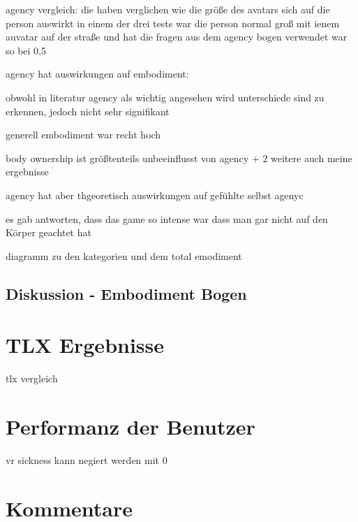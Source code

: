 agency vergleich: \cite{Abtahi2019}
die haben verglichen wie die größe des avatars sich auf die person auswirkt
in einem der drei tests war die person normal groß mit ienem auvatar auf der straße und hat die fragen aus dem agency bogen verwendet
war so bei 0,5


agency hat auswirkungen auf embodiment: \cite{Koilias2019}

obwohl in literatur agency als wichtig angesehen wird
unterschiede sind zu erkennen, jedoch nicht sehr signifikant

generell embodiment war recht hoch




body ownership ist größtenteils unbeeinflusst von agency \cite{Koilias2019} + 2 weitere
auch meine ergebnisse

agency hat aber thgeoretisch auswirkungen auf gefühlte selbst agenyc

es gab antworten, dass das game so intense war dass man gar nicht auf den Körper geachtet hat


diagramm zu den kategorien und dem total emodiment

\subsection{Diskussion - Embodiment Bogen}

\section{TLX Ergebnisse}
\cite{Abtahi2019}
tlx vergleich

\section{Performanz der Benutzer}


vr sickness kann negiert werden mit 0%

\section{Kommentare}




















